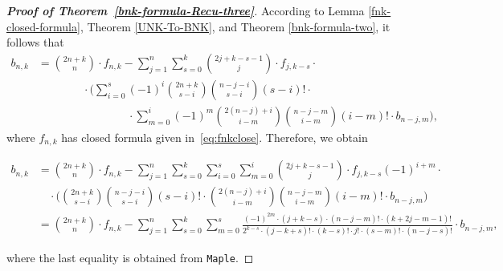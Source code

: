 \documentclass[reqno, 12pt]{article}
\theoremstyle{mydefinition}
\theoremstyle{myremark}
\numberwithin{algorithm}{section}
\begin{document}
\begin{proof}[{\bf Proof of Theorem~\ref{bnk-formula-Recu-three}}]
According to Lemma \ref{fnk-closed-formula}, Theorem \ref{UNK-To-BNK}, and Theorem \ref{bnk-formula-two}, it follows that
\begin{align*}
b_{n,k}&=\binom{2n+k}{n}\cdot f_{n,k}-\sum_{j=1}^n \sum_{s=0}^k \binom{2j+k-s-1}{j}\cdot f_{j,k-s}\cdot
\\ & \quad\quad\quad\quad \cdot \Bigg(\sum_{i=0}^s(-1)^i\binom{2n+k}{s-i}\binom{n-j-i}{s-i}(s-i)!\cdot
\\ & \quad\quad\quad\quad\quad\quad\quad\quad \cdot \sum_{m=0}^i(-1)^m\binom{2(n-j)+i}{i-m}\binom{n-j-m}{i-m}(i-m)!\cdot b_{n-j,m}\Bigg),
\end{align*}
where $f_{n,k}$ has closed formula given in~\eqref{eq:fnkclose}.
Therefore, we obtain
\begin{small}
\begin{align*}
b_{n,k}&=\binom{2n+k}{n}\cdot f_{n,k}-\sum_{j=1}^n \sum_{s=0}^k \sum_{i=0}^s \sum_{m=0}^i  \binom{2j+k-s-1}{j}\cdot f_{j,k-s}(-1)^{i+m}\cdot
\\ & \quad \cdot \Bigg(\binom{2n+k}{s-i}\binom{n-j-i}{s-i}(s-i)! \cdot\binom{2(n-j)+i}{i-m}\binom{n-j-m}{i-m}(i-m)!\cdot b_{n-j,m}\Bigg)
\\&=\binom{2n+k}{n}\cdot f_{n,k}-\sum_{j=1}^n \sum_{s=0}^k \sum_{m=0}^s
\frac{(-1)^{2m}\cdot(j+k-s)\cdot(n-j-m)!\cdot(k+2j-m-1)!}{2^{k-s}\cdot (j-k+s)!\cdot(k-s)!\cdot j!\cdot (s-m)!\cdot(n-j-s)!}\cdot b_{n-j,m},
\end{align*}
\end{small}
where the last equality is obtained from \texttt{Maple}.
\end{proof}
\end{document}
